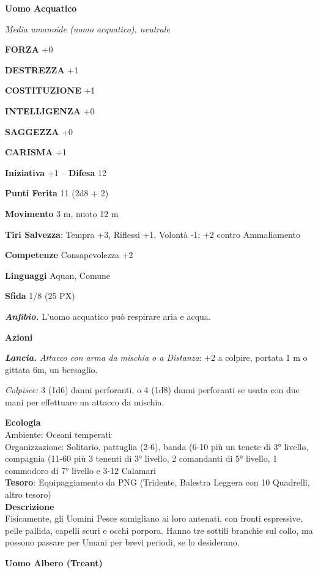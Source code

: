 \begin{multicols}{2}
\medskip{}\textbf{Uomo Acquatico}

\textit{Media umanoide (uomo acquatico), neutrale}

\textbf{FORZA} +0

\textbf{DESTREZZA} +1

\textbf{COSTITUZIONE} +1

\textbf{INTELLIGENZA} +0

\textbf{SAGGEZZA} +0

\textbf{CARISMA} +1

\textbf{Iniziativa} +1 -- \textbf{Difesa} 12

\textbf{Punti Ferita} 11 (2d8 + 2)

\textbf{Movimento} 3 m, nuoto 12 m

\textbf{Tiri Salvezza}: Tempra +3, Riflessi +1, Volontà -1; +2 contro Ammaliamento

\textbf{Competenze} Consapevolezza +2

\textbf{Linguaggi} Aquan, Comune

\textbf{Sfida} 1/8 (25 PX)

\textit{\textbf{Anfibio.}} L'uomo acquatico può respirare aria e acqua.

\textbf{Azioni}

\textit{\textbf{Lancia.} Attacco con arma da mischia o a Distanza}: +2 a colpire, portata 1 m o gittata 6m, un bersaglio.

\textit{Colpisce:} 3 (1d6) danni perforanti, o 4 (1d8) danni perforanti se usata con due mani per effettuare un attacco da mischia.

\textbf{Ecologia}\\
Ambiente: Oceani temperati\\
Organizzazione: Solitario, pattuglia (2-6), banda (6-10 più un tenete di 3° livello, compagnia (11-60 più 3 tenenti di 3° livello, 2 comandanti di 5° livello, 1 commodoro di 7° livello e 3-12 Calamari\\
\textbf{Tesoro}: Equipaggiamento da PNG (Tridente, Balestra Leggera con 10 Quadrelli, altro tesoro)\\
\textbf{Descrizione}\\
Fisicamente, gli Uomini Pesce somigliano ai loro antenati, con fronti espressive, pelle pallida, capelli scuri e occhi porpora. Hanno tre sottili branchie sul collo, ma possono passare per Umani per brevi periodi, se lo desiderano.

\medskip{}\textbf{Uomo Albero (Treant)}


\end{multicols}
